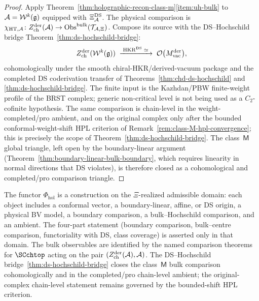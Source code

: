 \begin{proof}
Apply Theorem~\ref{thm:holographic-recon-class-m}\ref{item:uh-bulk} to
$\mathcal{A}=\mathcal{W}^k(\mathfrak{g})$ equipped with \(\Xi_{\mathcal{A}}^{\mathrm{DS}}\).  The
physical comparison is
\(\chi_{\mathrm{HT},\mathcal{A}}\colon
Z^{\mathrm{der}}_{\mathrm{ch}}(\mathcal{A})\to
\mathrm{Obs}^{\mathrm{bulk}}(\mathcal{T}_{\mathcal{A},\Xi})\).
Compose its source with the DS--Hochschild bridge
Theorem~\ref{thm:ds-hochschild-bridge}:
\[
Z^{\mathrm{der}}_{\mathrm{ch}}(\mathcal{W}^k(\mathfrak{g}))
\;\xrightarrow{\;\mathrm{HKR}^{\mathrm{DS}}\;\simeq\;}\;
\mathcal{O}\bigl(M_{\mathrm{vac}}^{\mathrm{der}}\bigr),
\]
  cohomologically under the smooth chiral-HKR/derived-vacuum package
  and the completed DS coderivation transfer of
  Theorems~\ref{thm:chd-ds-hochschild} and
  \ref{thm:ds-hochschild-bridge}.  The finite input is the
  Kazhdan/PBW finite-weight profile of the BRST complex; generic
  non-critical level is not being used as a \(C_2\)-cofinite
  hypothesis. The same comparison is chain-level in the
  weight-completed/pro ambient, and on the original complex only after
  the bounded conformal-weight-shift HPL criterion of
  Remark~\ref{rem:class-M-hpl-convergence}; this is precisely the scope
  of Theorem~\ref{thm:ds-hochschild-bridge}.
The class~$\mathsf{M}$ global triangle, left open by the
boundary-linear argument
(Theorem~\ref{thm:boundary-linear-bulk-boundary}, which requires
linearity in normal directions that DS violates), is therefore closed
as a cohomological and completed/pro comparison triangle.
\end{proof}

\begin{remark}%
\label{rem:universal-holography-admissible-construction}%
The functor $\Phi_{\mathrm{hol}}$ is a construction on the
\(\Xi\)-realized admissible domain: each object includes a conformal
vector, a boundary-linear, affine, or DS origin, a physical BV model, a
boundary comparison, a bulk--Hochschild comparison, and an ambient. The
four-part statement (boundary comparison, bulk--centre comparison,
functoriality with DS, class coverage) is asserted only in that domain.
The bulk observables are identified by the named comparison theorems
for $\SCchtop$ acting on the pair
$(Z^{\mathrm{der}}_{\mathrm{ch}}(\mathcal{A}),\mathcal{A})$.
The DS--Hochschild bridge~\ref{thm:ds-hochschild-bridge} closes the
class~$\mathsf{M}$ bulk comparison cohomologically and in the
completed/pro chain-level ambient; the original-complex chain-level
statement remains governed by the bounded-shift HPL criterion.
\end{remark}


